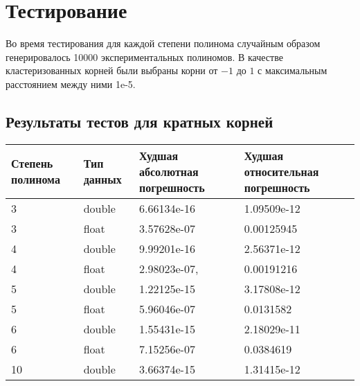 \documentclass[a4paper,12pt]{article}
\begin{document}
\newpage
\section{Тестирование}
Во время тестирования для каждой степени полинома случайным образом генерировалось 10000 экспериментальных полиномов. В качестве кластеризованных корней были выбраны корни от $-1$ до $1$ с максимальным расстоянием между ними 1e-5.
\subsection{Результаты тестов для кратных корней}
\begin{center}
  \begin{tabular}{|p{2.5cm}|p{3.0cm}|p{5.0cm}|p{5.0cm}|}
  \hline
  \textbf{Степень полинома}  & \textbf{Тип данных} & \textbf{Худшая абсолютная погрешность} & \textbf{Худшая относительная погрешность} \\
  \hline
  3 & double & 6.66134e-16 & 1.09509e-12 \\
  \hline
  3 & float & 3.57628e-07 & 0.00125945 \\
  \hline
  4 & double & 9.99201e-16 & 2.56371e-12 \\
  \hline
  4 & float & 2.98023e-07, & 0.00191216 \\
  \hline
  5 & double & 1.22125e-15 & 3.17808e-12 \\
  \hline
  5 & float & 5.96046e-07 & 0.0131582 \\
  \hline
  6 & double & 1.55431e-15 & 2.18029e-11 \\
  \hline
  6 & float & 7.15256e-07 & 0.0384619 \\
  \hline
  10 & double & 3.66374e-15 & 1.31415e-12 \\
  \hline
\end{tabular}
\label{tab:my_label_2}
\end{center}
\end{document}
